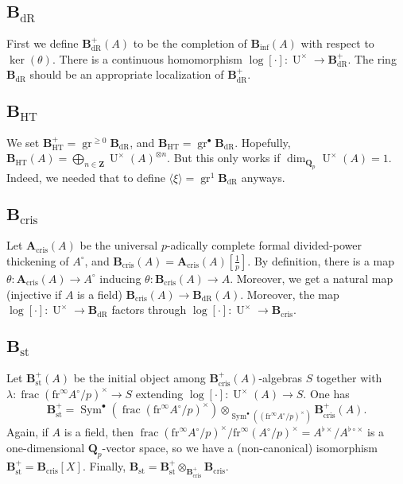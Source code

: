 \documentclass{article}
\DeclareMathOperator{\graded}{gr}
\DeclareMathOperator{\symmetric}{Sym}
\newcommand{\dQ}{\mathbf{Q}}
\newcommand{\dZ}{\mathbf{Z}}
\newcommand{\frobenius}{\mathrm{fr}}
\newcommand{\Binf}{\mathbf{B}_\mathrm{inf}}
\newcommand{\Acris}{\mathbf{A}_\mathrm{cris}}
\newcommand{\Bcris}{\mathbf{B}_\mathrm{cris}}
\newcommand{\Bdr}{\mathbf{B}_\mathrm{dR}}
\newcommand{\Bht}{\mathbf{B}_\mathrm{HT}}
\newcommand{\Bst}{\mathbf{B}_\mathrm{st}}
\DeclareMathOperator{\units}{U}
\begin{document}
\subsection{\texorpdfstring{$\Bdr$}{Bdr}}

First we define $\Bdr^+(A)$ to be the completion of 
$\Binf(A)$ with respect to $\ker(\theta)$. There is a continuous homomorphism 
$\log[\cdot]:\units^\times \to \Bdr^+$. The ring $\Bdr$ should be an 
appropriate localization of $\Bdr^+$. 


\subsection{\texorpdfstring{$\Bht$}{Bht}}

We set $\Bht^+=\graded^{\geqslant 0} \Bdr$, and 
$\Bht=\graded^\bullet \Bdr$. Hopefully, 
$\Bht(A)=\bigoplus_{n\in \dZ} \units^\times(A)^{\otimes n}$. But this only 
works if $\dim_{\dQ_p} \units^\times(A)=1$. Indeed, we needed that to define 
$\langle \xi\rangle = \graded^1\Bdr$ anyways. 


\subsection{\texorpdfstring{$\Bcris$}{Bcris}}

Let $\Acris(A)$ be the universal $p$-adically complete formal 
divided-power thickening of $A^\circ$, and $\Bcris(A)=\Acris(A)[\frac 1 p]$. By 
definition, there is a map $\theta:\Acris(A)\to A^\circ$ inducing 
$\theta:\Bcris(A)\to A$. Moreover, we get a natural map (injective if $A$ is a 
field) $\Bcris(A)\to \Bdr(A)$. Moreover, the map 
$\log[\cdot]:\units^\times \to \Bdr$ factors through 
$\log[\cdot]:\units^\times \to \Bcris$. 


\subsection{\texorpdfstring{$\Bst$}{Bst}}

Let $\Bst^+(A)$ be the initial object among $\Bcris^+(A)$-algebras $S$ together 
with $\lambda:\operatorname{frac}(\frobenius^\infty A^\circ/p)^\times\to S$ 
extending $\log[\cdot]:\units^\times(A)\to S$. One has 
\[
  \Bst^+=\symmetric^\bullet(\operatorname{frac}(\frobenius^\infty A^\circ/p)^\times)\otimes_{\symmetric^\bullet((\frobenius^\infty A^\circ/p)^\times)} \Bcris^+(A) .
\]
Again, if $A$ is a field, then 
$\operatorname{frac}(\frobenius^\infty A^\circ/p)^\times/\frobenius^\infty(A^\circ/p)^\times = A^{\flat\times} / A^{\flat\circ\times}$ is a one-dimensional $\dQ_p$-vector space, so we have a 
(non-canonical) isomorphism $\Bst^+=\Bcris[X]$. Finally, 
$\Bst=\Bst^+\otimes_{\Bcris^+} \Bcris$. 







\end{document}
